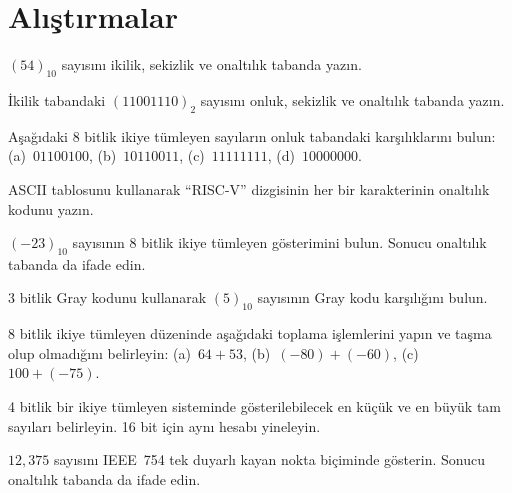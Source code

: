 \section*{Alıştırmalar}
\label{sec:ekA-alistirmalar}

\begin{alistirma}[\kolay]
$(54)_{10}$ sayısını ikilik, sekizlik ve onaltılık tabanda yazın.
\end{alistirma}

\begin{alistirma}[\kolay]
İkilik tabandaki $(11001110)_2$ sayısını onluk, sekizlik ve onaltılık tabanda yazın.
\end{alistirma}

\begin{alistirma}[\kolay]
Aşağıdaki 8 bitlik ikiye tümleyen sayıların onluk tabandaki karşılıklarını bulun: (a)~$01100100$, (b)~$10110011$, (c)~$11111111$, (d)~$10000000$.
\end{alistirma}

\begin{alistirma}[\kolay]
ASCII tablosunu kullanarak ``RISC-V'' dizgisinin her bir karakterinin onaltılık kodunu yazın.
\end{alistirma}

\begin{alistirma}[\kolay]
$(-23)_{10}$ sayısının 8 bitlik ikiye tümleyen gösterimini bulun. Sonucu onaltılık tabanda da ifade edin.
\end{alistirma}

\begin{alistirma}[\kolay]
3 bitlik Gray kodunu kullanarak $(5)_{10}$ sayısının Gray kodu karşılığını bulun.
\end{alistirma}

\begin{alistirma}[\orta]
8 bitlik ikiye tümleyen düzeninde aşağıdaki toplama işlemlerini yapın ve taşma olup olmadığını belirleyin: (a)~$64 + 53$, (b)~$(-80) + (-60)$, (c)~$100 + (-75)$.
\end{alistirma}

\begin{alistirma}[\orta]
4 bitlik bir ikiye tümleyen sisteminde gösterilebilecek en küçük ve en büyük tam sayıları belirleyin. 16 bit için aynı hesabı yineleyin.
\end{alistirma}

\begin{alistirma}[\orta]
$12{,}375$ sayısını IEEE~754 tek duyarlı kayan nokta biçiminde gösterin. Sonucu onaltılık tabanda da ifade edin.
\end{alistirma}

